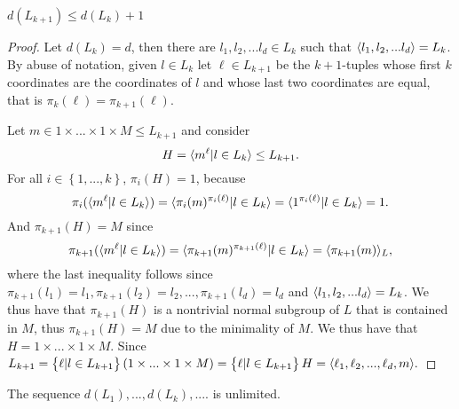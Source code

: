 \begin{theorem}
    \label{S2:bounddLk}
    $d(L_{k+1}) \le d(L_k) + 1$    
\end{theorem}
\begin{proof}
    Let $d(L_k) = d$, then there are $l_1, l_2, ... l_d \in L_k$ such that $\langle l_1, l_2, ... l_d \rangle = L_k$. By abuse of notation, given $l \in L_k$ let $\ell \in L_{k+1}$ be the $k+1$-tuples whose first $k$ coordinates are the coordinates of $l$ and whose last two coordinates are equal, that is $\pi_k(\ell) = \pi_{k+1}(\ell)$. 
        
    Let $m \in 1 \times ... \times 1 \times M \le L_{k+1}$ and consider
    $$H = \langle m^\ell | l \in L_k \rangle \le L_{k+1}.$$
    For all $i \in \left\{1, ..., k \right\}$, $\pi_i(H) = 1$, because
    $$\pi_i(\langle m^\ell | l \in L_k \rangle) = \langle \pi_i(m)^{\pi_i(\ell)} | l \in L_k \rangle = \langle 1^{\pi_i(\ell)} | l \in L_k \rangle = 1.$$ 
    And $\pi_{k+1}(H) = M$ since
    $$\pi_{k+1}(\langle m^\ell | l \in L_k \rangle) = \langle \pi_{k+1}(m)^{\pi_{k+1}(\ell)} | l \in L_k \rangle = \langle \pi_{k+1}(m) \rangle_L,$$
    where the last inequality follows since $\pi_{k+1}(l_1) = l_1, \pi_{k+1}(l_2) = l_2, ..., \pi_{k+1}(l_d) = l_d$ and $\langle l_1, l_2, ... l_d \rangle = L_k$. We thus have that $\pi_{k+1}(H)$ is a nontrivial normal subgroup of $L$ that is contained in $M$, thus $\pi_{k+1}(H) = M$ due to the minimality of $M$. We thus have that $H = 1 \times ... \times 1 \times M$.
    Since $L_{k+1} = \left\{ \ell | l \in L_{k+1} \right\}(1 \times ... \times 1 \times M) = \left\{ \ell | l \in L_{k+1} \right\} H = \langle \ell_1, \ell_2, ... , \ell_d, m \rangle.$
    
\end{proof}

\begin{theorem}
    \label{S2:undLk}
    The sequence $d(L_1),...,d(L_k), ....$ is unlimited.
\end{theorem}

